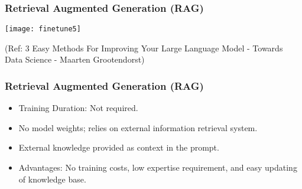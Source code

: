 \begin{frame}[fragile]\frametitle{Retrieval Augmented Generation (RAG)}


		\begin{center}
		\texttt{[image: finetune5]}
		\end{center}

{\tiny (Ref: 3 Easy Methods For Improving Your Large Language Model - Towards Data Science - Maarten Grootendorst)}

\end{frame}
\begin{frame}[fragile]\frametitle{Retrieval Augmented Generation (RAG)}

      \begin{itemize}
        \item Training Duration: Not required.
        \item No model weights; relies on external information retrieval system.
        \item External knowledge provided as context in the prompt.
        \item Advantages: No training costs, low expertise requirement, and easy updating of knowledge base.
      \end{itemize}

\end{frame}


